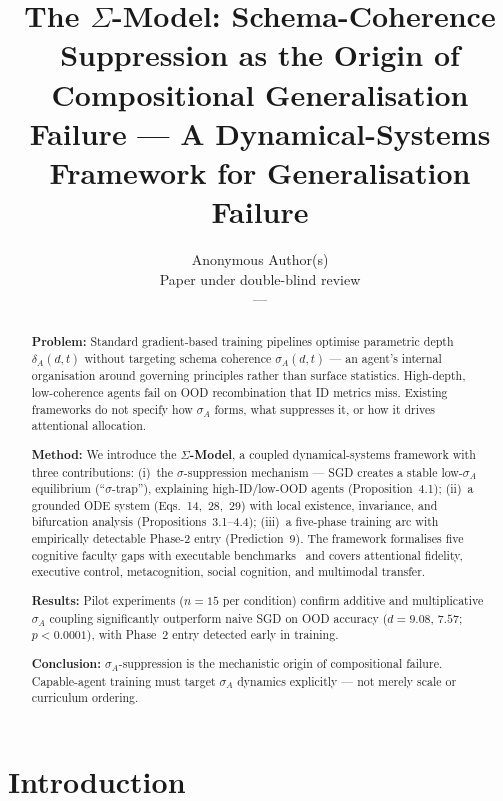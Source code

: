 \documentclass[10pt]{article}
\title{The $\Sigma$-Model: Schema-Coherence Suppression as the Origin of Compositional Generalisation Failure --- A Dynamical-Systems Framework for Generalisation Failure}
\author{\name Anonymous Author(s) \\
\addr Paper under double-blind review \\
\email ---}
\begin{document}
\begin{abstract}
\textbf{Problem:} Standard gradient-based training pipelines optimise
parametric depth $\delta_A(d,t)$ without targeting schema coherence
$\sigma_A(d,t)$ --- an agent's internal organisation around governing
principles rather than surface statistics. High-depth, low-coherence
agents fail on OOD recombination that ID metrics miss. Existing
frameworks do not specify how $\sigma_A$ forms, what suppresses it,
or how it drives attentional allocation.

\textbf{Method:} We introduce the \textbf{$\Sigma$-Model}, a coupled
dynamical-systems framework with three contributions: (i)~the
$\sigma$-suppression mechanism --- SGD creates a stable
low-$\sigma_A$ equilibrium (``$\sigma$-trap''), explaining
high-ID/low-OOD agents (Proposition~4.1); (ii)~a grounded ODE system
(Eqs.~14,~28,~29) with local existence, invariance, and bifurcation
analysis (Propositions~3.1--4.4); (iii)~a five-phase training arc
with empirically detectable Phase-2 entry (Prediction~9). The
framework formalises five cognitive faculty gaps with executable
benchmarks~\cite{burnell2026measuringprogressagi} and covers
attentional fidelity, executive control, metacognition, social
cognition, and multimodal transfer.

\textbf{Results:} Pilot experiments ($n = 15$ per condition) confirm
additive and multiplicative $\sigma_A$ coupling significantly
outperform naive SGD on OOD accuracy ($d = 9.08$, $7.57$;
$p < 0.0001$), with Phase~2 entry detected early in training.

\textbf{Conclusion:} $\sigma_A$-suppression is the mechanistic origin
of compositional failure. Capable-agent training must target
$\sigma_A$ dynamics explicitly --- not merely scale or curriculum
ordering.
\end{abstract}

\maketitle

\section{Introduction}\label{sec:introduction}
\end{document}
